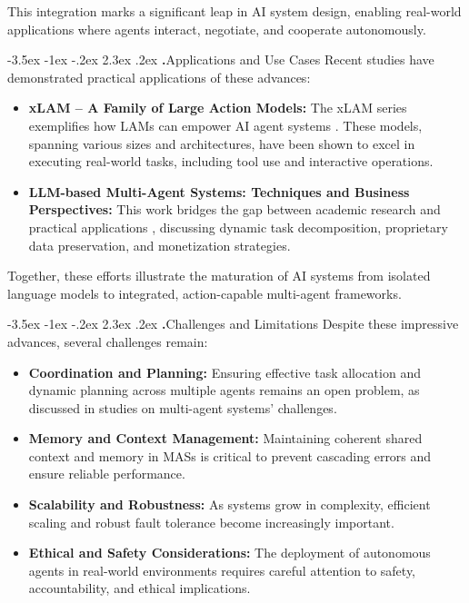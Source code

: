 \documentclass[journal,twoside,10pt]{IEEEtran}
\makeatletter
\renewcommand\section{\@startsection{section}{1}{\z@}%
                       {-3.5ex \@plus -1ex \@minus -.2ex}%
                       {2.3ex \@plus.2ex}%
                       {\normalfont\Large\bfseries\Roman{section}.\quad}}
\makeatother
\begin{document}
This integration marks a significant leap in AI system design, enabling real-world applications where agents interact, negotiate, and cooperate autonomously.

\section{Applications and Use Cases}
Recent studies have demonstrated practical applications of these advances:

\begin{itemize}
    \item \textbf{xLAM – A Family of Large Action Models:} The xLAM series exemplifies how LAMs can empower AI agent systems \cite{xlam2024}. These models, spanning various sizes and architectures, have been shown to excel in executing real-world tasks, including tool use and interactive operations.
    \item \textbf{LLM-based Multi-Agent Systems: Techniques and Business Perspectives:} This work bridges the gap between academic research and practical applications \cite{mas_business2023}, discussing dynamic task decomposition, proprietary data preservation, and monetization strategies.
\end{itemize}

Together, these efforts illustrate the maturation of AI systems from isolated language models to integrated, action-capable multi-agent frameworks.

\section{Challenges and Limitations}
Despite these impressive advances, several challenges remain:

\begin{itemize}
    \item \textbf{Coordination and Planning:} Ensuring effective task allocation and dynamic planning across multiple agents remains an open problem, as discussed in studies on multi-agent systems' challenges.
    \item \textbf{Memory and Context Management:} Maintaining coherent shared context and memory in MASs is critical to prevent cascading errors and ensure reliable performance.
    \item \textbf{Scalability and Robustness:} As systems grow in complexity, efficient scaling and robust fault tolerance become increasingly important.
    \item \textbf{Ethical and Safety Considerations:} The deployment of autonomous agents in real-world environments requires careful attention to safety, accountability, and ethical implications.
\end{itemize}
\end{document}
